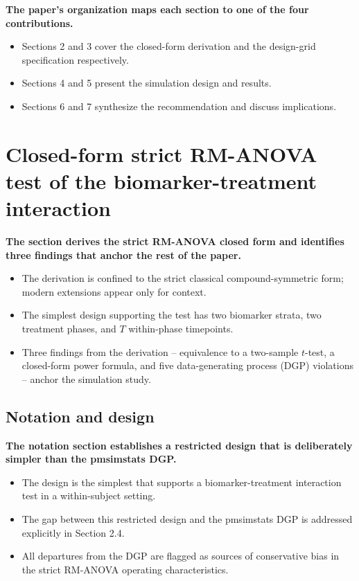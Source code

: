 \documentclass[
  11pt,
]{article}
\begin{document}
\textbf{The paper's organization maps each section to one of the four contributions.}

\begin{itemize}\setlength{\itemsep}{2pt}\setlength{\parskip}{0pt}
\item Sections 2 and 3 cover the closed-form derivation and the design-grid specification respectively.
\item Sections 4 and 5 present the simulation design and results.
\item Sections 6 and 7 synthesize the recommendation and discuss implications.
\end{itemize}

\section{Closed-form strict RM-ANOVA test of the biomarker-treatment interaction}\label{closed-form-strict-rm-anova-test-of-the-biomarker-treatment-interaction}

\textbf{The section derives the strict RM-ANOVA closed form and identifies three findings that anchor the rest of the paper.}

\begin{itemize}\setlength{\itemsep}{2pt}\setlength{\parskip}{0pt}
\item The derivation is confined to the strict classical compound-symmetric form; modern extensions appear only for context.
\item The simplest design supporting the test has two biomarker strata, two treatment phases, and $T$ within-phase timepoints.
\item Three findings from the derivation -- equivalence to a two-sample $t$-test, a closed-form power formula, and five data-generating process (DGP) violations -- anchor the simulation study.
\end{itemize}

\subsection{Notation and design}\label{notation-and-design}

\textbf{The notation section establishes a restricted design that is deliberately simpler than the pmsimstats DGP.}

\begin{itemize}\setlength{\itemsep}{2pt}\setlength{\parskip}{0pt}
\item The design is the simplest that supports a biomarker-treatment interaction test in a within-subject setting.
\item The gap between this restricted design and the pmsimstats DGP is addressed explicitly in Section 2.4.
\item All departures from the DGP are flagged as sources of conservative bias in the strict RM-ANOVA operating characteristics.
\end{itemize}
\end{document}
